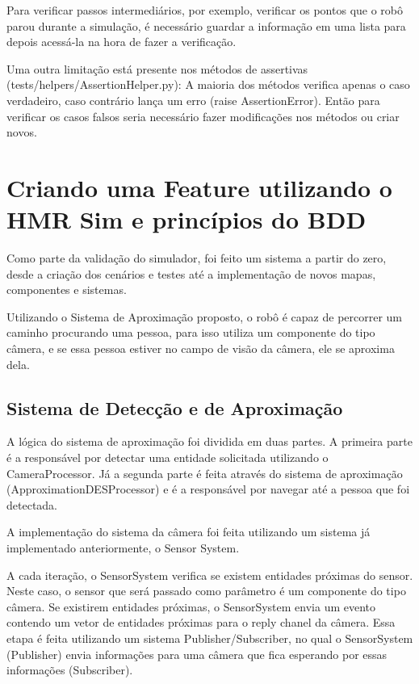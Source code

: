 Para verificar passos intermediários, por exemplo, verificar os pontos que o robô parou durante a simulação, é necessário guardar a informação em uma lista para depois acessá-la na hora de fazer a verificação.

Uma outra limitação está presente nos métodos de assertivas (tests/helpers/AssertionHelper.py): A maioria dos métodos verifica apenas o caso verdadeiro, caso contrário lança um erro (raise AssertionError). Então para verificar os casos falsos seria necessário fazer modificações nos métodos ou criar novos.

\section{Criando uma Feature utilizando o HMR Sim e princípios do BDD}
\label{sec:featureBDD}
Como parte da validação do simulador, foi feito um sistema a partir do zero, desde a criação dos cenários e testes até a implementação de novos mapas, componentes e sistemas.

Utilizando o Sistema de Aproximação proposto, o robô é capaz de percorrer um caminho procurando uma pessoa, para isso utiliza um componente do tipo câmera, e se essa pessoa estiver no campo de visão da câmera, ele se aproxima dela. 

\subsection{Sistema de Detecção e de Aproximação}
\label{sec:sistemaAprox}
A lógica do sistema de aproximação foi dividida em duas partes. A primeira parte é a responsável por detectar uma entidade solicitada utilizando o CameraProcessor. Já a segunda parte é feita através do sistema de aproximação (ApproximationDESProcessor) e é a responsável por navegar até a pessoa que foi detectada.

A implementação do sistema da câmera foi feita utilizando um sistema já implementado anteriormente, o Sensor System.

A cada iteração, o SensorSystem verifica se existem entidades próximas do sensor. Neste caso, o sensor que será passado como parâmetro é um componente do tipo câmera. Se existirem entidades próximas, o SensorSystem envia um evento contendo um vetor de entidades próximas  para o reply chanel da câmera. Essa etapa é feita utilizando um sistema Publisher/Subscriber, no qual o SensorSystem (Publisher) envia informações 
para uma câmera que fica esperando por essas informações (Subscriber).

